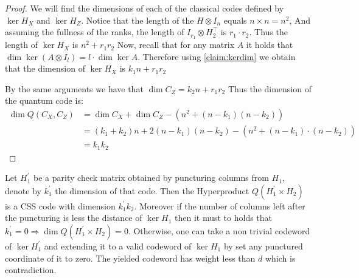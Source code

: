 \begin{proof}

  We will find the dimensions of each of the classical codes defined by $\ker H_{X}$ and $ \ker H_{Z}$. Notice that the length of the $H \otimes I_{n}$ equals $n\times n = n^2$, And  assuming the fullness of the ranks, the length of $ I_{r_{1}} \otimes  H_{2}^{\top} $  is $ r_{1}\cdot r_{2}$. Thus the length of $ \ker H_{X}$ is  $n^{2} + r_{1}r_{2}$ 
  Now, recall that for any matrix $A$ it holds that $\dim \ker \left( A \otimes I_{l} \right) = l \cdot \dim \ker A$. Therefore using \cref{claim:kerdim} we obtain that the dimension of $\ker H_{X}$ is $k_{1}n + r_{1}r_{2}$ 

  By the same arguments we have that $\dim C_{Z} = k_{2}n + r_{1}r_{2}$ %
Thus the dimension of the quantum code is:
  \begin{equation*}
    \begin{split}
      \dim Q\left( C_{X}, C_{Z} \right) &= \dim C_{X} + \dim C_{Z} - \left(  n^{2} + (n-k_{1})(n-k_{2})  \right) \\ 
      & = \left( k_{1} + k_{2} \right)n + 2(n-k_{1})(n-k_{2}) -\left(  n^{2} +  (n-k_{1}) \cdot \left( n -k_{2}\right) \right) \\
      & =k_{1}k_{2} 
    \end{split}
  \end{equation*}
\end{proof}

\begin{remark}
  \label{remark:pun}
  Let $H_{1}^{\prime}$ be a parity check matrix obtained by puncturing columns from $H_{1}$, denote by $k^{\prime}_{1}$ the dimension of that code. Then the Hyperproduct $Q(H_{1}^{\prime}\times H_{2})$ is a CSS code with dimension $k^{\prime}_{1}k_{2}$. Moreover if the number of columns left after the puncturing is less the distance of $\ker H_{1}$ then it must to holds that $k^{\prime}_{1} = 0 \Rightarrow \dim Q(H_{1}^{\prime} \times H_{2}) = 0$. Otherwise, one can take a non trivial codeword of $\ker H^{\prime}_{1}$ and extending it to a valid codeword of $\ker H_{1}$ by set any punctured coordinate of it to zero. The yielded codeword has weight less than $d$ which is contradiction.  
\end{remark}

